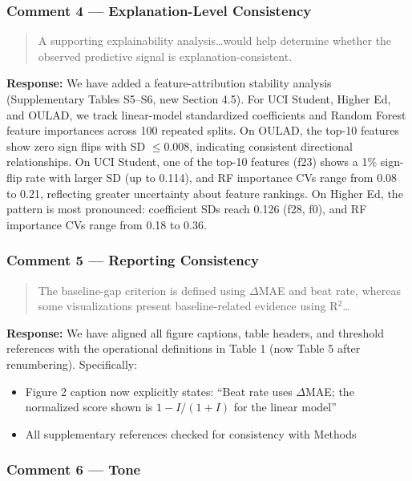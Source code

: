 \documentclass[12pt,a4paper]{article}
\begin{document}
\subsubsection*{Comment 4 --- Explanation-Level Consistency}

\begin{quote}
A supporting explainability analysis\ldots would help determine whether the observed predictive signal is explanation-consistent.
\end{quote}

\textbf{Response:} We have added a feature-attribution stability analysis (Supplementary Tables S5--S6, new Section 4.5). For UCI Student, Higher Ed, and OULAD, we track linear-model standardized coefficients and Random Forest feature importances across 100 repeated splits. On OULAD, the top-10 features show zero sign flips with SD $\leq 0.008$, indicating consistent directional relationships. On UCI Student, one of the top-10 features (f23) shows a 1\% sign-flip rate with larger SD (up to 0.114), and RF importance CVs range from 0.08 to 0.21, reflecting greater uncertainty about feature rankings. On Higher Ed, the pattern is most pronounced: coefficient SDs reach 0.126 (f28, f0), and RF importance CVs range from 0.18 to 0.36.

\subsubsection*{Comment 5 --- Reporting Consistency}

\begin{quote}
The baseline-gap criterion is defined using $\Delta$MAE and beat rate, whereas some visualizations present baseline-related evidence using R$^2$\ldots
\end{quote}

\textbf{Response:} We have aligned all figure captions, table headers, and threshold references with the operational definitions in Table 1 (now Table 5 after renumbering). Specifically:
\begin{itemize}[nosep]
\item Figure 2 caption now explicitly states: ``Beat rate uses $\Delta$MAE; the normalized score shown is $1-I/(1+I)$ for the linear model''
\item All supplementary references checked for consistency with Methods
\end{itemize}

\subsubsection*{Comment 6 --- Tone}
\end{document}
